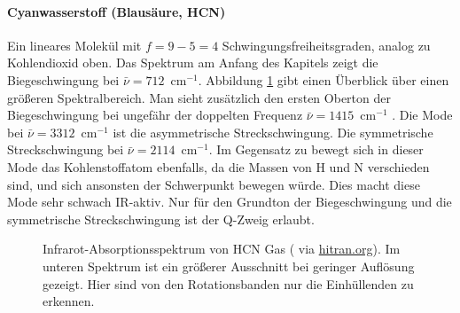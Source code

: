\paragraph{Cyanwasserstoff (Blausäure, HCN)}  
\begin{marginfigure}
\end{marginfigure}
Ein lineares Molekül mit $f=9 - 5 = 4$ Schwingungsfreiheitsgraden, analog zu Kohlendioxid oben. Das Spektrum am Anfang des Kapitels zeigt die Biegeschwingung bei $\bar{\nu} = 712$~cm$^{-1}$.  Abbildung \ref{fig:vib_hcn_all} gibt einen Überblick über einen größeren Spektralbereich. Man sieht zusätzlich den 
ersten Oberton der Biegeschwingung bei ungefähr der doppelten Frequenz  $\bar{\nu} = 1415$~cm$^{-1}$
. Die Mode bei  $\bar{\nu} = 3312$~cm$^{-1}$ ist die  asymmetrische Streckschwingung. Die symmetrische Streckschwingung  bei $\bar{\nu} = 2114$~cm$^{-1}$.
 Im Gegensatz zu  bewegt sich in dieser Mode das Kohlenstoffatom ebenfalls, da die Massen von H und N verschieden sind, und sich ansonsten der  Schwerpunkt bewegen würde. Dies macht diese Mode sehr schwach IR-aktiv.  Nur für den Grundton der Biegeschwingung und die  symmetrische Streckschwingung ist der Q-Zweig erlaubt.

\begin{figure}
\caption{Infrarot-Absorptionsspektrum von HCN Gas  (\cite{Maki_1995_HCN} via \href{https://hitran.org}{hitran.org}). Im unteren Spektrum ist ein größerer Ausschnitt bei geringer Auflösung gezeigt. Hier sind von den Rotationsbanden nur die Einhüllenden zu erkennen.
\label{fig:vib_hcn_all}}
\end{figure}








\printbibliography[segment=\therefsegment,heading=subbibliography]

